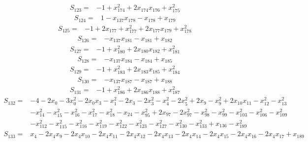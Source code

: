 \begin{align*}
S_{123}={}&-1+x_{174}^{2}+2x_{174}x_{176}+x_{175}^{2}
\end{align*}
\begin{align*}
S_{124}={}&1-x_{137}x_{178}-x_{178}+x_{179}
\end{align*}
\begin{align*}
S_{125}={}&-1+2x_{177}+x_{177}^{2}+2x_{177}x_{179}+x_{178}^{2}
\end{align*}
\begin{align*}
S_{126}={}&-x_{137}x_{181}-x_{181}+x_{182}
\end{align*}
\begin{align*}
S_{127}={}&-1+x_{180}^{2}+2x_{180}x_{182}+x_{181}^{2}
\end{align*}
\begin{align*}
S_{128}={}&-x_{137}x_{184}-x_{184}+x_{185}
\end{align*}
\begin{align*}
S_{129}={}&-1+x_{183}^{2}+2x_{183}x_{185}+x_{184}^{2}
\end{align*}
\begin{align*}
S_{130}={}&-x_{137}x_{187}-x_{187}+x_{188}
\end{align*}
\begin{align*}
S_{131}={}&-1+x_{186}^{2}+2x_{186}x_{188}+x_{187}^{2}
\end{align*}
\begin{align*}
S_{132}={}&-4-2x_{0}-3x_{0}^{2}-2x_{0}x_{3}-x_{1}^{2}-2x_{3}-2x_{3}^{2}-x_{4}^{2}-2x_{5}^{2}+2x_{9}-x_{9}^{2}+2x_{10}x_{11}-x_{12}^{2}-x_{13}^{2}\\
{}&-x_{14}^{2}-x_{15}^{2}-x_{16}^{2}-x_{17}^{2}-x_{18}^{2}-x_{24}-x_{95}^{2}+2x_{97}-2x_{97}^{2}-x_{98}^{2}-x_{99}^{2}-x_{103}^{2}-x_{106}^{2}-x_{109}^{2}\\
{}&-x_{112}^{2}-x_{115}^{2}-x_{116}^{2}-x_{119}^{2}-x_{122}^{2}-x_{123}^{2}-x_{127}^{2}-x_{130}^{2}-x_{133}^{2}+x_{136}-x_{189}^{2}
\end{align*}
\begin{align*}
S_{133}={}&x_{4}-2x_{4}x_{9}-2x_{4}x_{10}-2x_{4}x_{11}-2x_{4}x_{12}-2x_{4}x_{13}-2x_{4}x_{14}-2x_{4}x_{15}-2x_{4}x_{16}-2x_{4}x_{17}+x_{189}
\end{align*}
